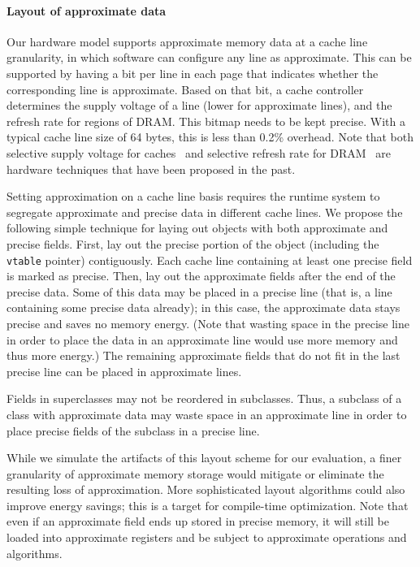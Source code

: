 \paragraph{Layout of approximate data} Our hardware model supports
approximate memory data at a cache line granularity, in which software
can configure any line as approximate. This can be supported by having a
bit per line in each page that indicates whether the corresponding line is
approximate. Based on that bit, a cache controller determines
the supply voltage of a line (lower for approximate lines), and the
refresh rate for regions of DRAM\@. This bitmap needs to be kept
precise. With a typical cache line size of 64 bytes, this is less
than 0.2\% overhead. Note that both selective supply voltage for
caches~\cite{drowsycaches} and selective refresh rate for
DRAM~\cite{smartrefresh} are hardware techniques that have been
proposed in the past.

Setting approximation on a cache line basis requires the runtime
system to segregate approximate and precise data in different
cache lines. We propose the following simple
technique for laying out objects with both approximate and precise
fields. First, lay out the precise portion of the object (including
the \texttt{vtable} pointer) contiguously. Each cache line containing at least
one precise field is marked as precise. Then, lay out the approximate
fields after the end of the precise data. Some of this data may
be placed in a precise line (that is, a line containing some precise
data already); in this case, the approximate data stays precise and
saves no memory energy.
(Note that wasting space in the precise line in order to place the
data in an approximate line would use more memory and thus more
energy.)
The remaining approximate fields that do not
fit in the last precise line can be placed in approximate lines.

Fields in superclasses may not be reordered in subclasses.
Thus, a subclass of a class with approximate data may waste space in
an approximate line in order to place precise fields of the subclass
in a precise line.

While we simulate the artifacts of this layout scheme for our evaluation,
a finer granularity of approximate memory storage would mitigate or
eliminate the resulting loss of approximation.
More sophisticated layout algorithms could also improve energy savings;
this is a target for compile-time optimization.
Note that
even if an approximate field ends up stored in precise memory, it will
still be loaded into approximate registers and be subject to
approximate operations and algorithms.

